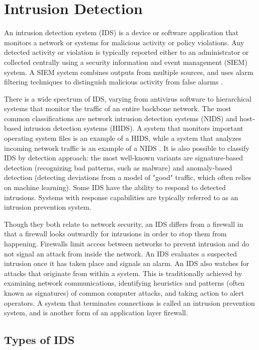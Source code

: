 \documentclass[12pt]{article}
\theoremstyle{definition}
\begin{document}
	\section{Intrusion Detection}\label{sec:i-detection}
		An intrusion detection system (IDS) is a device or software application that monitors a network or systems for malicious activity or policy violations. Any detected activity or violation is typically reported either to an administrator or collected centrally using a security information and event management (SIEM) system. A SIEM system combines outputs from multiple sources, and uses alarm filtering techniques to distinguish malicious activity from false alarms \cite{Takenaka2016}.
		
		There is a wide spectrum of IDS, varying from antivirus software to hierarchical systems that monitor the traffic of an entire backbone network. The most common classifications are network intrusion detection systems (NIDS) and host-based intrusion detection systems (HIDS). A system that monitors important operating system files is an example of a HIDS, while a system that analyzes incoming network traffic is an example of a NIDS \cite{So-In2016}. It is also possible to classify IDS by detection approach: the most well-known variants are signature-based detection (recognizing bad patterns, such as malware) and anomaly-based detection (detecting deviations from a model of "good" traffic, which often relies on machine learning). Some IDS have the ability to respond to detected intrusions. Systems with response capabilities are typically referred to as an intrusion prevention system.
		
		Though they both relate to network security, an IDS differs from a firewall in that a firewall looks outwardly for intrusions in order to stop them from happening. Firewalls limit access between networks to prevent intrusion and do not signal an attack from inside the network. An IDS evaluates a suspected intrusion once it has taken place and signals an alarm. An IDS also watches for attacks that originate from within a system. This is traditionally achieved by examining network communications, identifying heuristics and patterns (often known as signatures) of common computer attacks, and taking action to alert operators. A system that terminates connections is called an intrusion prevention system, and is another form of an application layer firewall.
		\subsection{Types of IDS}
\end{document}
